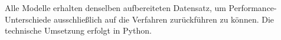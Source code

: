 \documentclass[12pt,a4paper]{article}
\begin{document}


Alle Modelle erhalten denselben aufbereiteten Datensatz, um Performance-Unterschiede ausschließlich
auf die Verfahren zurückführen zu können. Die technische Umsetzung erfolgt in Python.

%
\end{document}
